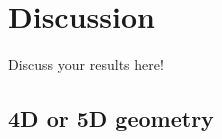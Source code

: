 \chapter{Discussion}
\label{chap:discussion}

Discuss your results here!


\section{4D or 5D geometry}